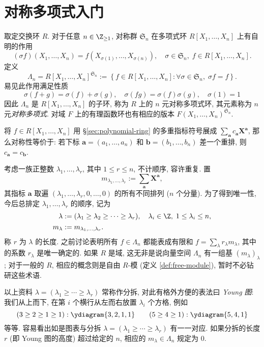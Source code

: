 \section{对称多项式入门}\label{sec:symmetric-poly}
取定交换环 $R$. 对于任意 $n \in \Z_{\geq 1}$, 对称群 $\mathfrak{S}_n$ 在多项式环 $R[X_1, \ldots, X_n]$ 上有自明的作用
\[ (\sigma f)(X_1, \ldots, X_n) = f(X_{\sigma(1)}, \ldots, X_{\sigma(n)}), \quad \sigma \in \mathfrak{S}_n, \; f \in R[X_1, \ldots, X_n]. \]
定义
\[ \Lambda_n = R[X_1, \ldots, X_n]^{\mathfrak{S}_n} := \left\{ f \in R[X_1, \ldots, X_n] : \forall \sigma \in \mathfrak{S}_n, \; \sigma f = f \right\}. \]
易见此作用满足性质
\[ \sigma(f + g) = \sigma(f) + \sigma(g), \quad \sigma(fg) = \sigma(f) \sigma(g), \quad \sigma(1)=1 \]
因此 $\Lambda_n$ 是 $R[X_1, \ldots, X_n]$ 的子环, 称为 $R$ 上的 $n$ 元对称多项式环, 其元素称为 $n$ 元\emph{对称多项式}. 对域 $F$ 上的有理函数环也有相应的版本 $F(X_1, \ldots, X_n)^{\mathfrak{S}_n}$.

将 $f \in R[X_1, \ldots, X_n]$ 用 \S\ref{sec:polynomial-ring} 的多重指标符号展成 $\sum_{\bm{a}} c_{\bm{a}} \bm{X}^{\bm{a}}$, 那么对称性等价于: 若下标 $\bm{a} = (a_1, \ldots, a_n)$ 和 $\bm{b} = (b_1, \ldots, b_n)$ 差一个重排, 则 $c_{\bm{a}} = c_{\bm{b}}$.

考虑一族正整数 $\lambda_1, \ldots, \lambda_r$, 其中 $1 \leq r \leq n$, 不计顺序, 容许重复. 置
\[ m_{\lambda_1, \ldots, \lambda_r} := \sum_{\bm{a}} \bm{X}^{\bm{a}}, \]
其指标 $\bm{a}$ 取遍 $(\lambda_1, \ldots, \lambda_r, 0, \ldots, 0)$ 的所有不同排列 ($n$ 个分量). 为了得到唯一性, 今后总排定 $\lambda_1, \ldots, \lambda_r$ 的顺序, 记为
\begin{align*}
	\lambda & := (\lambda_1 \geq \lambda_2 \geq \cdots \geq \lambda_r), \quad \lambda_i \in \Z, \; 1 \leq \lambda_i \leq n, \\
	m_\lambda & := m_{\lambda_1, \ldots, \lambda_r}.
\end{align*}
称 $r$ 为 $\lambda$ 的长度. 之前讨论表明所有 $f \in \Lambda_n$ 都能表成有限和 $f = \sum_\lambda r_\lambda m_\lambda$, 其中的系数 $r_\lambda$ 是唯一确定的. 如果 $R$ 是域, 这无非是说向量空间 $\Lambda_n$ 有一组基 $(m_\lambda)_\lambda$; 对于一般的 $R$, 相应的概念则是自由 $R$-模 (定义 \ref{def:free-module}), 暂时不必钻研这些术语.

以上资料 $\lambda = (\lambda_1 \geq \cdots \geq \lambda_r)$ 常称作分拆, 对此有格外方便的表法曰 \emph{Young 图}: 我们从上而下, 在第 $i$ 个横行从左而右放置 $\lambda_i$ 个方格, 例如  
\begin{equation*}
	(3 \geq 2 \geq 1 \geq 1): \ydiagram{3,2,1,1} \qquad (5 \geq 4 \geq 1): \ydiagram{5,4,1}
\end{equation*}
等等. 容易看出如是图表与分拆 $\lambda = (\lambda_1 \geq \cdots \geq \lambda_r)$ 有一一对应. 如果分拆的长度 $r$ (即 Young 图的高度) 超过给定的 $n$, 相应的 $m_\lambda \in \Lambda_n$ 规定为 $0$.

